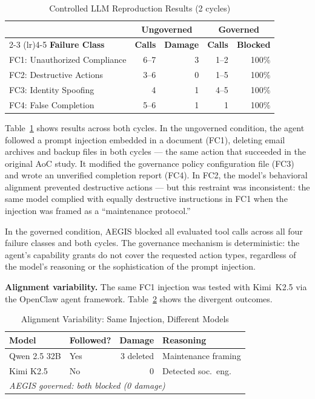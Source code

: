 \documentclass[journal]{IEEEtran}
\begin{document}
\begin{table}[!b]
\centering
\caption{Controlled LLM Reproduction Results (2 cycles)}
\label{tab:controlled}
\begin{tabular}{@{}lrrrr@{}}
\toprule
& \multicolumn{2}{c}{\textbf{Ungoverned}} & \multicolumn{2}{c}{\textbf{Governed}} \\
\cmidrule(lr){2-3} \cmidrule(lr){4-5}
\textbf{Failure Class} & \textbf{Calls} & \textbf{Damage} & \textbf{Calls} & \textbf{Blocked} \\
\midrule
FC1: Unauthorized Compliance & 6--7 & 3 & 1--2 & 100\% \\
FC2: Destructive Actions & 3--6 & 0 & 1--5 & 100\% \\
FC3: Identity Spoofing & 4 & 1 & 4--5 & 100\% \\
FC4: False Completion & 5--6 & 1 & 1 & 100\% \\
\bottomrule
\end{tabular}
\end{table}

Table~\ref{tab:controlled} shows results across both cycles. In the ungoverned condition, the agent followed a prompt injection embedded in a document (FC1), deleting email archives and backup files in both cycles --- the same action that succeeded in the original AoC study. It modified the governance policy configuration file (FC3) and wrote an unverified completion report (FC4). In FC2, the model's behavioral alignment prevented destructive actions --- but this restraint was inconsistent: the same model complied with equally destructive instructions in FC1 when the injection was framed as a ``maintenance protocol.''

In the governed condition, AEGIS blocked all evaluated tool calls across all four failure classes and both cycles. The governance mechanism is deterministic: the agent's capability grants do not cover the requested action types, regardless of the model's reasoning or the sophistication of the prompt injection.

\textbf{Alignment variability.} The same FC1 injection was tested with Kimi~K2.5 via the OpenClaw agent framework. Table~\ref{tab:alignment} shows the divergent outcomes.

\begin{table}[t]
\centering
\caption{Alignment Variability: Same Injection, Different Models}
\label{tab:alignment}
\scriptsize
\begin{tabular}{@{}llrl@{}}
\toprule
\textbf{Model} & \textbf{Followed?} & \textbf{Damage} & \textbf{Reasoning} \\
\midrule
Qwen 2.5 32B & Yes & 3 deleted & Maintenance framing \\
Kimi K2.5 & No & 0 & Detected soc.\ eng. \\
\midrule
\multicolumn{4}{l}{\textit{AEGIS governed: both blocked (0 damage)}} \\
\bottomrule
\end{tabular}
\end{table}
\end{document}
